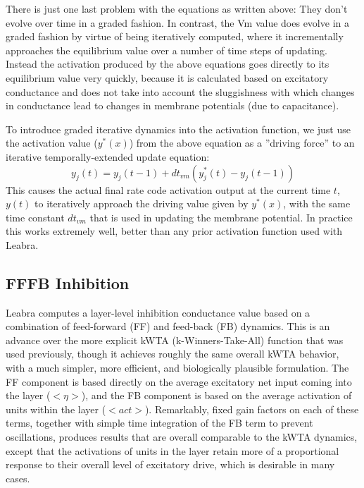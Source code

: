 There is just one last problem with the equations as written above: They don't evolve over time in a graded fashion.  In contrast, the Vm value does evolve in a graded fashion by virtue of being iteratively computed, where it incrementally approaches the equilibrium value over a number of time steps of updating.  Instead the activation produced by the above equations goes directly to its equilibrium value very quickly, because it is calculated based on excitatory conductance and does not take into account the sluggishness with which changes in conductance lead to changes in membrane potentials (due to capacitance).

To introduce graded iterative dynamics into the activation function, we just use the activation value ($y^*(x)$) from the above equation as a ''driving force'' to an iterative temporally-extended update equation:
\begin{equation}
  y_j(t) = y_j(t-1) + dt_{vm} \left(y_j^*(t) - y_j(t-1) \right)
 \label{eq.y_iter}
\end{equation}
This causes the actual final rate code activation output at the current time $t$, $y(t)$ to iteratively approach the driving value given by $y^*(x)$, with the same time constant $dt_{vm}$ that is used in updating the membrane potential.  In practice this works extremely well, better than any prior activation function used with Leabra.


\subsection{FFFB Inhibition}

Leabra computes a layer-level inhibition conductance value based on a combination of feed-forward (FF) and feed-back (FB) dynamics.  This is an advance over the more explicit kWTA (k-Winners-Take-All) function that was used previously, though it achieves roughly the same overall kWTA behavior, with a much simpler, more efficient, and biologically plausible formulation.  The FF component is based directly on the average excitatory net input coming into the layer ($<\eta>$), and the FB component is based on the average activation of units within the layer ($<act>$).  Remarkably, fixed gain factors on each of these terms, together with simple time integration of the FB term to prevent oscillations, produces results that are overall comparable to the kWTA dynamics, except that the activations of units in the layer retain more of a proportional response to their overall level of excitatory drive, which is desirable in many cases.

